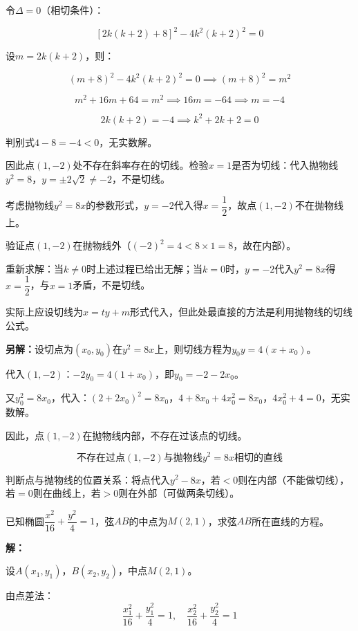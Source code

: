 \documentclass[12pt, a4paper]{ctexart}
\begin{document}
令$\Delta = 0$（相切条件）：

$$[2k(k+2) + 8]^2 - 4k^2(k+2)^2 = 0$$

设$m = 2k(k+2)$，则：

$$(m + 8)^2 - 4k^2(k+2)^2 = 0 \implies (m+8)^2 = m^2$$

$$m^2 + 16m + 64 = m^2 \implies 16m = -64 \implies m = -4$$

$$2k(k+2) = -4 \implies k^2 + 2k + 2 = 0$$

判别式$4 - 8 = -4 < 0$，无实数解。

因此点$(1, -2)$处不存在斜率存在的切线。检验$x = 1$是否为切线：代入抛物线$y^2 = 8$，$y = \pm 2\sqrt{2} \neq -2$，不是切线。

考虑抛物线$y^2 = 8x$的参数形式，$y = -2$代入得$x = \dfrac{1}{2}$，故点$(1, -2)$不在抛物线上。

验证点$(1, -2)$在抛物线外（$(-2)^2 = 4 < 8 \times 1 = 8$，故在内部）。

重新求解：当$k \neq 0$时上述过程已给出无解；当$k = 0$时，$y = -2$代入$y^2 = 8x$得$x = \dfrac{1}{2}$，与$x = 1$矛盾，不是切线。

实际上应设切线为$x = ty + m$形式代入，但此处最直接的方法是利用抛物线的切线公式。

\textbf{另解：}设切点为$(x_0, y_0)$在$y^2 = 8x$上，则切线方程为$y_0 y = 4(x + x_0)$。

代入$(1, -2)$：$-2y_0 = 4(1 + x_0)$，即$y_0 = -2 - 2x_0$。

又$y_0^2 = 8x_0$，代入：$(2 + 2x_0)^2 = 8x_0$，$4 + 8x_0 + 4x_0^2 = 8x_0$，$4x_0^2 + 4 = 0$，无实数解。

因此，点$(1, -2)$在抛物线内部，不存在过该点的切线。

$$\boxed{\text{不存在过点}(1,-2)\text{与抛物线}y^2=8x\text{相切的直线}}$$

\begin{warnbox}[方法总结]
判断点与抛物线的位置关系：将点代入$y^2 - 8x$，若$< 0$则在内部（不能做切线），若$= 0$则在曲线上，若$> 0$则在外部（可做两条切线）。
\end{warnbox}

\begin{examplebox}
已知椭圆$\dfrac{x^2}{16} + \dfrac{y^2}{4} = 1$，弦$AB$的中点为$M(2, 1)$，求弦$AB$所在直线的方程。
\end{examplebox}

\textbf{解：}

设$A(x_1, y_1)$，$B(x_2, y_2)$，中点$M(2, 1)$。

由点差法：
$$\frac{x_1^2}{16} + \frac{y_1^2}{4} = 1, \quad \frac{x_2^2}{16} + \frac{y_2^2}{4} = 1$$
\end{document}
